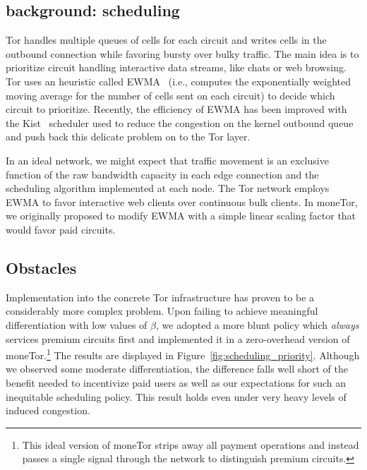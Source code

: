 \subsection{background: scheduling}

Tor handles multiple queues of cells for each circuit and writes cells in the
outbound connection while favoring bursty over bulky traffic. The main idea is
to prioritize circuit handling interactive data streams, like chats or web
browsing. Tor uses an heuristic called EWMA~\cite{tang2010improved} (i.e.,
computes the exponentially weighted moving average for the number of cells sent
on each circuit) to decide which circuit to prioritize. Recently, the efficiency
of EWMA has been improved with the Kist~\cite{jansen2014never} scheduler used to
reduce the congestion on the kernel outbound queue and push back this delicate
problem on to the Tor layer.

In an ideal network, we might expect that traffic movement is an exclusive
function of the raw bandwidth capacity in each edge connection and the
scheduling algorithm implemented at each node. The Tor network employs EWMA to
favor interactive web clients over continuous bulk clients. In moneTor, we
originally proposed to modify EWMA with a simple linear scaling factor that
would favor paid circuits.

\subsection{Obstacles}

Implementation into the concrete Tor infrastructure has proven to be a
considerably more complex problem. Upon failing to achieve meaningful
differentiation with low values of $\beta$, we adopted a more blunt policy which
\emph{always} services premium circuits first and implemented it in a
zero-overhead version of moneTor.\footnote{This ideal version of moneTor strips
  away all payment operations and instead passes a single signal through the
  network to distinguish premium circuits.} The results are displayed in
Figure~\ref{fig:scheduling_priority}. Although we observed some moderate
differentiation, the difference falls well short of the benefit needed to
incentivize paid users as well as our expectations for such an inequitable
scheduling policy. This result holds even under very heavy levels of induced
congestion.

